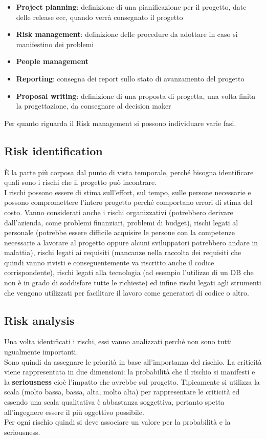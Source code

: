\begin{itemize}[noitemsep]
    \item \textbf{Project planning}: definizione di una pianificazione per il progetto, date delle release ecc, quando verrà consegnato il progetto
    \item \textbf{Risk management}: definizione delle procedure da adottare in caso si manifestino dei problemi
    \item \textbf{People management}
    \item \textbf{Reporting}: consegna dei report sullo stato di avanzamento del progetto
    \item \textbf{Proposal writing}: definizione di una proposta di progetta, una volta finita la progettazione, da consegnare al decision maker
\end{itemize}
Per quanto riguarda il Risk management si possono individuare varie fasi.

\subsection{Risk identification}
È la parte più corposa dal punto di vista temporale, perché bisogna identificare quali sono i rischi che il progetto può incontrare.\\
I rischi possono essere di stima sull'effort, sul tempo, sulle persone necessarie e possono compromettere l'intero progetto perché comportano errori di stima del costo.
Vanno considerati anche i rischi organizzativi (potrebbero derivare dall'azienda, come problemi finanziari, problemi di budget), rischi legati al personale (potrebbe essere difficile acquisire le persone con la competenze necessarie a lavorare al progetto oppure alcuni sviluppatori potrebbero andare in malattia), rischi legati ai requisiti (mancanze nella raccolta dei requisiti che quindi vanno rivisti e conseguentemente va riscritto anche il codice corrispondente), rischi legati alla tecnologia (ad esempio l'utilizzo di un \acrshort{DB} che non è in grado di soddisfare tutte le richieste) ed infine rischi legati agli strumenti che vengono utilizzati per facilitare il lavoro come generatori di codice o altro.

\subsection{Risk analysis}
Una volta identificati i rischi, essi vanno analizzati perché non sono tutti ugualmente importanti.\\
Sono quindi da assegnare le priorità in base all'importanza del rischio.
La criticità viene rappresentata in due dimensioni: la probabilità che il rischio si manifesti e la \textbf{seriousness} cioè l'impatto che avrebbe sul progetto.
Tipicamente si utilizza la scala (molto bassa, bassa, alta, molto alta) per rappresentare le criticità ed essendo una scala qualitativa è abbastanza soggettiva, pertanto spetta all'ingegnere essere il più oggettivo possibile.\\
Per ogni rischio quindi si deve associare un valore per la probabilità e la seriousness.

